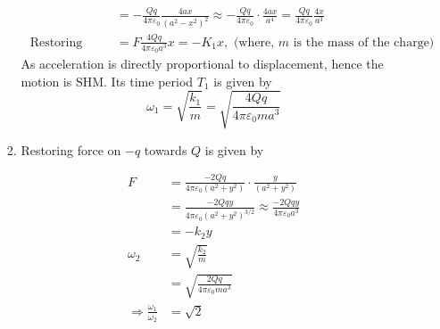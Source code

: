 \begin{enumerate}[label=\color{ocre}\textbf{\arabic*.}]
\begin{enumerate}
\begin{answer}
\begin{enumerate}[label=(\alph*)]
\begin{align*}
				&=-\frac{Q q}{4 \pi \varepsilon_{0}} \frac{4 a x}{\left(a^{2}-x^{2}\right)^{2}} \approx-\frac{Q q}{4 \pi \varepsilon_{0}} \cdot \frac{4 a x}{a^{4}}=\frac{Q q}{4 \pi \varepsilon_{0}} \frac{4 x}{a^{3}}\\
				\text { Restoring force }&=F \frac{4 Q q}{4 \pi \varepsilon_{0} a^{3}} x=-K_{1} x, \text { (where, } m \text { is the mass of the charge) }
			\end{align*}
			As acceleration is directly proportional to displacement, hence the motion is SHM. Its time period $T_{1}$ is
			given by
			$$\omega_{1}=\sqrt{\frac{k_{1}}{m}}=\sqrt{\frac{4 Q q}{4 \pi \varepsilon_{0} m a^{3}}}$$
			\item Restoring force on $-q$ towards $Q$ is given by
			
			\begin{align*}
			F&=\frac{-2 Q q}{4 \pi \varepsilon_{0}\left(a^{2}+y^{2}\right)} \cdot \frac{y}{\left(a^{2}+y^{2}\right)}\\&=\frac{-2 Q q y}{4 \pi \varepsilon_{0}\left(a^{2}+y^{2}\right)^{3 / 2}} \approx \frac{-2 Q q y}{4 \pi \varepsilon_{0} a^{3}}\\&=-k_{2} y \\
			\omega_{2}&=\sqrt{\frac{k_{2}}{m}}\\&=\sqrt{\frac{2 Q q}{4 \pi \varepsilon_{0} m a^{3}}} \\\Rightarrow \frac{\omega_{1}}{\omega_{2}}&=\sqrt{2}
			\end{align*}
			

\end{enumerate}
\end{answer}
\end{enumerate}
\end{enumerate}
